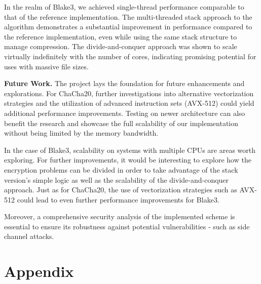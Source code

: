 \documentclass[letterpaper]{article}
\newcommand{\mypar}[1]{{\bf #1.}}
\begin{document}
In the realm of Blake3, we achieved single-thread performance comparable to that of the reference implementation. The multi-threaded stack approach to the algorithm demonstrates a substantial improvement in performance compared to the reference implementation, even while using the same stack structure to manage compression. The divide-and-conquer approach was shown to scale virtually indefinitely with the number of cores, indicating promising potential for uses with massive file sizes.

\mypar{Future Work}
The project lays the foundation for future enhancements and explorations. For ChaCha20, further investigations into alternative vectorization strategies and the utilization of advanced instruction sets (AVX-512) could yield additional performance improvements. Testing on newer architecture can also benefit the research and showcase the full scalability of our implementation without being limited by the memory bandwidth. 

In the case of Blake3, scalability on systems with multiple CPUs are areas worth exploring. For further improvements, it would be interesting to explore how the encryption problems can be divided in order to take advantage of the stack version's simple logic as well as the scalability of the divide-and-conquer approach. Just as for ChaCha20, the use of vectorization strategies such as AVX-512 could lead to even further performance improvements for Blake3.

Moreover, a comprehensive security analysis of the implemented scheme is essential to ensure its robustness against potential vulnerabilities - such as side channel attacks. 




\newpage
\renewcommand{\thesection}{\Alph{section}}
\renewcommand{\thesubsection}{\arabic{subsection}}
\setcounter{section}{0}
\section{Appendix}
\label{sec:A}
\end{document}
